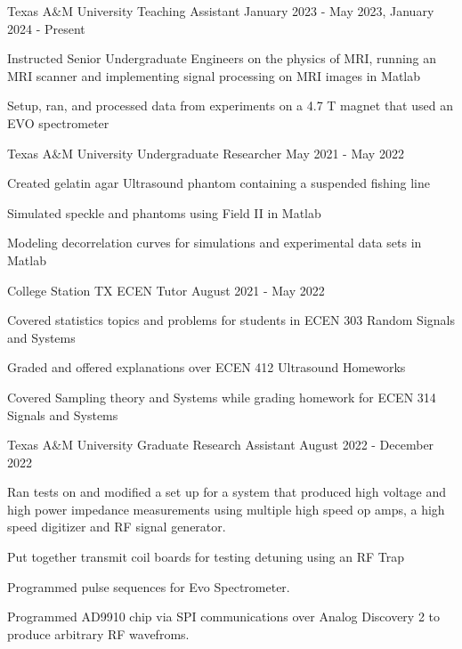 \documentclass[11pt]{article} %
\begin{document}
\begin{description}
\squish

{Texas A$\&$M University}
{Teaching Assistant}
{January 2023 - May 2023, January 2024 - Present}

Instructed Senior Undergraduate Engineers on the physics of MRI, running an MRI scanner and implementing signal processing on MRI images in Matlab 

Setup, ran, and processed data from experiments on a 4.7 T magnet that used an EVO spectrometer



{Texas A$\&$M University}
{Undergraduate Researcher}
{May 2021 - May 2022}


Created gelatin agar Ultrasound phantom containing a suspended fishing line

Simulated speckle and phantoms using Field II in Matlab

Modeling decorrelation curves for simulations and experimental data sets in Matlab



{College Station TX}
{ECEN Tutor}
{August 2021 - May 2022}

Covered statistics topics and problems for students in ECEN 303 Random Signals and Systems 

Graded and offered explanations over ECEN 412 Ultrasound Homeworks

Covered Sampling theory and Systems while grading homework for ECEN 314 Signals and Systems





{Texas A$\&$M University}
{Graduate Research Assistant}
{August 2022 - December 2022}

Ran tests on and modified a set up for a system that produced high voltage and high power impedance measurements using multiple high speed op amps, a high speed digitizer and RF signal generator.

Put together transmit coil boards for testing detuning using an RF Trap

Programmed pulse sequences for Evo Spectrometer.

Programmed AD9910 chip via SPI communications over Analog Discovery 2 to produce arbitrary RF wavefroms. 

%
%


\end{description}
\end{document}
